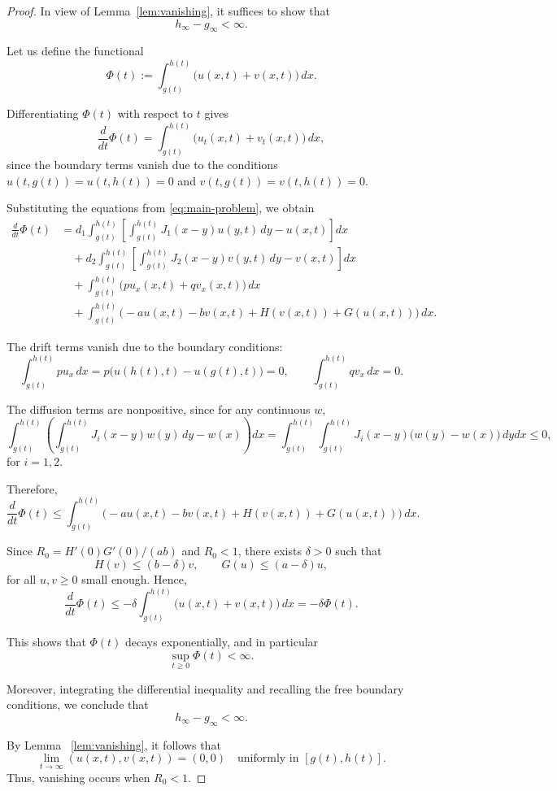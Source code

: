 \documentclass[a4paper,11pt]{amsart}
\theoremstyle{definition}
\numberwithin{equation}{section}
\theoremstyle{definition}
\begin{document}
\begin{proof}
In view of Lemma~\eqref{lem:vanishing}, it suffices to show that
\[
h_\infty - g_\infty < \infty.
\]

Let us define the functional
\[
\Phi(t) := \int_{g(t)}^{h(t)} \Big(u(x,t) + v(x,t)\Big)\,dx.
\]

Differentiating $\Phi(t)$ with respect to $t$ gives
\[
\frac{d}{dt}\Phi(t) = \int_{g(t)}^{h(t)} \Big(u_t(x,t) + v_t(x,t)\Big)\,dx,
\]
since the boundary terms vanish due to the conditions $u(t,g(t))=u(t,h(t))=0$ and $v(t,g(t))=v(t,h(t))=0$.

Substituting the equations from \eqref{eq:main-problem}, we obtain
\begin{align*}
\frac{d}{dt}\Phi(t) &= d_1 \int_{g(t)}^{h(t)} \left[\int_{g(t)}^{h(t)} J_1(x-y)u(y,t)\,dy - u(x,t)\right] dx \\
&\quad + d_2 \int_{g(t)}^{h(t)} \left[\int_{g(t)}^{h(t)} J_2(x-y)v(y,t)\,dy - v(x,t)\right] dx \\
&\quad + \int_{g(t)}^{h(t)} \Big( pu_x(x,t) + q v_x(x,t) \Big)\,dx \\
&\quad + \int_{g(t)}^{h(t)} \Big(-a u(x,t) - b v(x,t) + H(v(x,t)) + G(u(x,t))\Big)\,dx.
\end{align*}

The drift terms vanish due to the boundary conditions:
\[
\int_{g(t)}^{h(t)} p u_x\,dx = p\big(u(h(t),t)-u(g(t),t)\big)=0,
\qquad
\int_{g(t)}^{h(t)} q v_x\,dx = 0.
\]

The diffusion terms are nonpositive, since for any continuous $w$,
\[
\int_{g(t)}^{h(t)} \left(\int_{g(t)}^{h(t)} J_i(x-y)w(y)\,dy - w(x)\right)dx =
\int_{g(t)}^{h(t)}\int_{g(t)}^{h(t)} J_i(x-y)\big(w(y)-w(x)\big)\,dydx \leq 0,
\]
for $i=1,2$.

Therefore,
\[
\frac{d}{dt}\Phi(t) \leq \int_{g(t)}^{h(t)} \Big(-a u(x,t) - b v(x,t) + H(v(x,t)) + G(u(x,t))\Big)\,dx.
\]

Since $R_0 = H'(0)G'(0)/(ab)$ and $R_0 < 1$, there exists $\delta > 0$ such that
\[
H(v) \le (b-\delta) v,
\qquad
G(u) \le (a-\delta) u,
\]
for all $u,v \ge 0$ small enough. Hence,
\[
\frac{d}{dt}\Phi(t) \leq -\delta \int_{g(t)}^{h(t)} \big(u(x,t) + v(x,t)\big)\,dx = -\delta \Phi(t).
\]

This shows that $\Phi(t)$ decays exponentially, and in particular
\[
\sup_{t\geq0} \Phi(t) < \infty.
\]

Moreover, integrating the differential inequality and recalling the free boundary conditions, we conclude that
\[
h_\infty - g_\infty < \infty.
\]

By Lemma~ \eqref{lem:vanishing}, it follows that
\[
\lim_{t\to\infty} (u(x,t), v(x,t)) = (0,0)
\quad \text{uniformly in } [g(t),h(t)].
\]
Thus, vanishing occurs when $R_0 < 1$.
\end{proof}
\end{document}
